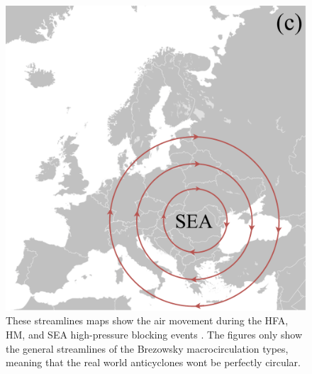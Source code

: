 \begin{figure}[H]
\begin{minipage}{0.32\textwidth}
    \end{minipage}
    \hfill
    \begin{minipage}{0.32\textwidth}
        \includegraphics[width=\linewidth]{Figures/SEA.pdf}
    \end{minipage}
    \caption{These streamlines maps show the air movement during the HFA, HM, and SEA high-pressure blocking events \cite{siglermarianBlankMapEurope2007}. The figures only show the general streamlines of the Brezowsky macrocirculation types, meaning that the real world anticyclones wont be perfectly circular.}
    \label{fig:map}
\end{figure}